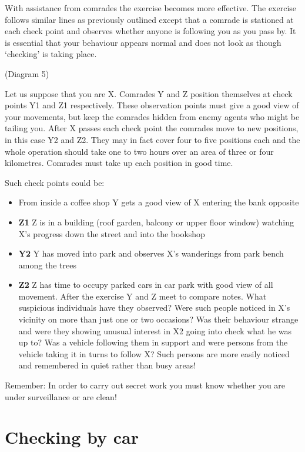With assistance from comrades the exercise becomes more effective. The
exercise follows similar lines as previously outlined except that a
comrade is stationed at each check point and observes whether anyone is
following you as you pass by. It is essential that your behaviour
appears normal and does not look as though `checking' is taking place.

(Diagram 5)

Let us suppose that you are X. Comrades Y and Z position themselves at
check points Y1 and Z1 respectively. These observation points must give
a good view of your movements, but keep the comrades hidden from enemy
agents who might be tailing you. After X passes each check point the
comrades move to new positions, in this case Y2 and Z2. They may in fact
cover four to five positions each and the whole operation should take
one to two hours over an area of three or four kilometres. Comrades must
take up each position in good time.

Such check points could be:

\begin{itemize}
\tightlist
\item
  From inside a coffee shop Y gets a good view of X entering the bank
  opposite
\item
  \textbf{Z1} Z is in a building (roof garden, balcony or upper floor
  window) watching X's progress down the street and into the bookshop
\item
  \textbf{Y2} Y has moved into park and observes X's wanderings from
  park bench among the trees
\item
  \textbf{Z2} Z has time to occupy parked cars in car park with good
  view of all movement. After the exercise Y and Z meet to compare
  notes. What suspicious individuals have they observed? Were such
  people noticed in X's vicinity on more than just one or two occasions?
  Was their behaviour strange and were they showing unusual interest in
  X2 going into check what he was up to? Was a vehicle following them in
  support and were persons from the vehicle taking it in turns to follow
  X? Such persons are more easily noticed and remembered in quiet rather
  than busy areas!
\end{itemize}

Remember: In order to carry out secret work you must know whether you
are under surveillance or are clean!

\section{Checking by car}

